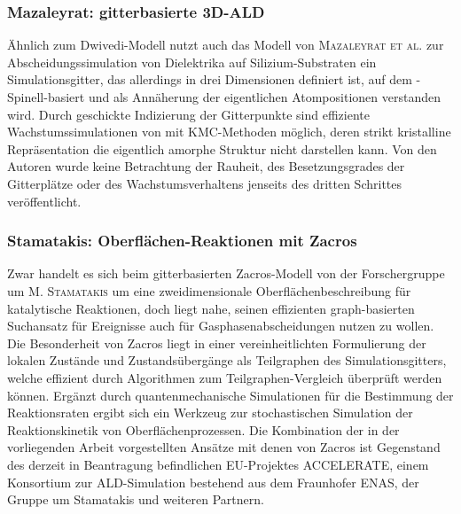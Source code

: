 \subsubsection{Mazaleyrat: gitterbasierte 3D-ALD}

Ähnlich zum Dwivedi-Modell nutzt auch das Modell von \textsc{Mazaleyrat et al.}\cite{mazaleyrat_methodology_2005} zur Abscheidungssimulation von Dielektrika auf Silizium-Substraten ein Simulationsgitter, das allerdings in drei Dimensionen definiert ist, auf dem -Spinell-basiert und als Annäherung der eigentlichen Atompositionen verstanden wird.
Durch geschickte Indizierung der Gitterpunkte sind effiziente Wachstumssimulationen von  mit KMC-Methoden möglich, deren strikt kristalline Repräsentation die eigentlich amorphe Struktur nicht darstellen kann.
Von den Autoren wurde keine Betrachtung der Rauheit, des Besetzungsgrades der Gitterplätze oder des Wachstumsverhaltens jenseits des dritten Schrittes veröffentlicht.

\subsubsection{Stamatakis: Oberflächen-Reaktionen mit Zacros}

Zwar handelt es sich beim gitterbasierten Zacros-Modell von der Forschergruppe um \textsc{M. Stamatakis}\cite{stamatakis_graph-theoretical_2011,nielsen_parallel_2013,stamatakis_zacros_2014} um eine zweidimensionale Oberflächenbeschreibung für katalytische Reaktionen, doch liegt nahe, seinen effizienten graph-basierten Suchansatz für Ereignisse auch für Gasphasenabscheidungen nutzen zu wollen.
Die Besonderheit von Zacros liegt in einer vereinheitlichten Formulierung der lokalen Zustände und Zustandsübergänge als Teilgraphen des Simulationsgitters, welche effizient durch Algorithmen zum Teilgraphen-Vergleich überprüft werden können.
Ergänzt durch quantenmechanische Simulationen für die Bestimmung der Reaktionsraten ergibt sich ein Werkzeug zur stochastischen Simulation der Reaktionskinetik von Oberflächenprozessen.
Die Kombination der in der vorliegenden Arbeit vorgestellten Ansätze mit denen von Zacros ist Gegenstand des derzeit in Beantragung befindlichen EU-Projektes ACCELERATE, einem Konsortium zur ALD-Simulation bestehend aus dem Fraunhofer ENAS, der Gruppe um Stamatakis und weiteren Partnern.

